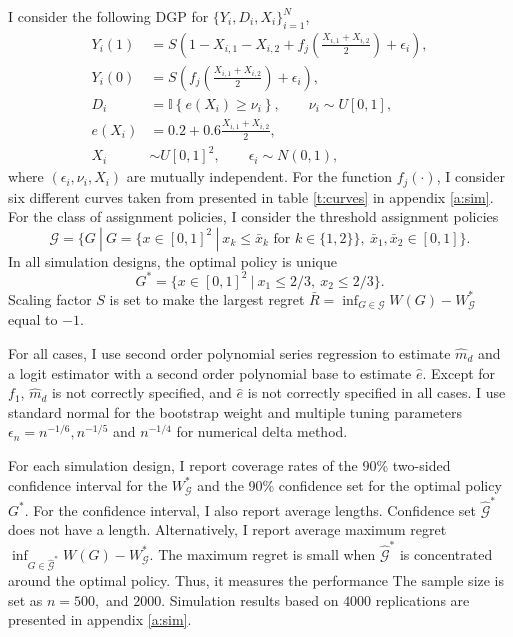 \documentclass[12pt,oneside,reqno,english]{amsart}
\theoremstyle{definition}
\begin{document}
I consider the following DGP for $\{Y_{i},D_{i},X_{i}\}_{i=1}^{N}$, 
\begin{align*}
Y_{i}(1) & =  S(1-X_{i,1}-X_{i,2}+f_{j}\left(\frac{X_{i,1}+X_{i,2}}{2} \right)+\epsilon_{i}),\\
Y_{i}(0) &=   S(f_{j}\left(\frac{X_{i,1}+X_{i,2}}{2} \right)+\epsilon_{i}),\\
D_{i} & =  \mathbb{I}\left\{e\left(X_{i} \right)\geq\nu_{i}\right\},\qquad \nu_{i}\sim U[0,1],\\
e(X_{i}) & =  0.2+0.6\frac{X_{i,1}+X_{i,2}}{2},\\
X_{i} & \sim  U[0,1]^{2},\qquad \epsilon_{i}\sim N(0,1),
\end{align*}
where $(\epsilon_{i},\nu_{i},X_{i})$ are mutually independent. 
For the function $f_{j}(\cdot)$, I consider six different curves taken from \cite{Frolich:04} 
presented in table \ref{t:curves} in appendix \ref{a:sim}. 
For the class of assignment policies, I consider the threshold assignment policies
\[\mathcal{G}=\{G\ |\ G=\{x\in [0,1]^{2} \ | \ x_{k}\leq \bar{x}_{k}\mbox{ for } k\in \{1,2\}  \},\ \bar{x}_{1},\bar{x}_{2}\in [0,1] \}.\]
In all simulation designs, the optimal policy is unique 
\[G^{*}=\{x\in [0,1]^{2}\ | \  x_{1}\leq 2/3,\ x_{2}\leq 2/3\}.\]
Scaling factor $S$ is set to make the largest regret $\bar{R}=\inf_{G\in \mathcal{G}}W(G)-W^{*}_{\mathcal{G}}$
equal to $-1$.  

For all cases, I use second order polynomial series regression to estimate $\hat{m}_{d}$ and a logit
estimator with a second order polynomial base to estimate $\hat{e}$. 
Except for $f_{1}$, $\hat{m}_{d}$ is not correctly specified, and $\hat{e}$ is not correctly specified in all cases.
I use standard normal for the bootstrap weight and multiple tuning parameters $\epsilon_{n}=n^{-1/6},n^{-1/5}$ and $n^{-1/4}$ for numerical delta method. 

For each simulation design, I report coverage rates of the 90\% two-sided confidence interval for the $W^{*}_{\mathcal{G}}$ 
and the 90\%  confidence set for the optimal policy $G^{*}$. For the confidence interval, I also report average
lengths. Confidence set $\hat{\mathcal{G}}^{*}$ does not have a length. Alternatively, I report average maximum regret 
$\inf_{G\in \hat{\mathcal{G}}^{*}}W(G)-W^{*}_{\mathcal{G}}$. The maximum regret is small when $\hat{\mathcal{G}}^{*}$ is concentrated 
around the optimal policy. Thus, it measures the performance   
The sample size is set as $n=500,$ and $2000$. Simulation results based on $4000$ replications are presented in appendix \ref{a:sim}.
\end{document}
